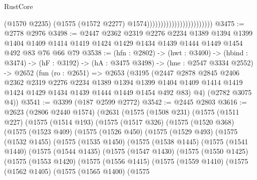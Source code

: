 \begin{lexlean}{RustCore}
\begin{coremodule}
                                                  (@1570 @2235)
                                                  (@1575 (@1572 @2277) @1574))))))))))))))))))))))))
@3475 := @2778 @2976
@3498 := @2447
    @2362
    @2319
    @2276
    @2234
    @1389
    @1394
    @1399
    @1404
    @1409
    @1414
    @1419
    @1424
    @1429
    @1434
    @1439
    @1444
    @1449
    @1454
    @492
    @83
    @76
    @66
    @79
@3538 := (hfn : @2802) ->
  (hwt : @3400) ->
  (hbind : @3474) ->
  (hF : @3192) ->
  (hA : @3475 @3498) ->
  (hne : @2547 @3334 @2552) ->
  @2652
    (fun (ro : @2651) =>
    @2653
      (@3195
        (@2447
          @2878
          @2845
          @2406
          @2362
          @2319
          @2276
          @2234
          @1389
          @1394
          @1399
          @1404
          @1409
          @1414
          @1419
          @1424
          @1429
          @1434
          @1439
          @1444
          @1449
          @1454
          @492
          @83)
        @4)
      (@2782 @3075 @4))
@3541 := @3399 (@187 @2599 @2772)
@3542 := @2445 @2803
@3616 := @2623
    (@2806 @2440 @1574)
    (@2631
      (@1575
        (@1508 @231)
        (@1575
          (@1511 @227)
          (@1575
            (@1514 @193)
            (@1575
              (@1517 @326)
              (@1575
                (@1520 @368)
                (@1575
                  (@1523 @409)
                  (@1575
                    (@1526 @450)
                    (@1575
                      (@1529 @493)
                      (@1575
                        (@1532 @1455)
                        (@1575
                          (@1535 @1450)
                          (@1575
                            (@1538 @1445)
                            (@1575
                              (@1541 @1440)
                              (@1575
                                (@1544 @1435)
                                (@1575
                                  (@1547 @1430)
                                  (@1575
                                    (@1550 @1425)
                                    (@1575
                                      (@1553 @1420)
                                      (@1575
                                        (@1556 @1415)
                                        (@1575
                                          (@1559 @1410)
                                          (@1575
                                            (@1562 @1405)
                                            (@1575
                                              (@1565 @1400)
                                              (@1575

\end{coremodule}
\end{lexlean}
